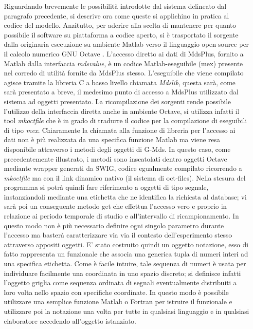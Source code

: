 Riguardando brevemente le possibilità introdotte dal sistema delineato
dal paragrafo precedente, si descrive ora come queste si applichino in
pratica al codice del modello. Anzitutto, per aderire alla scelta di
mantenere per quanto possibile il software su piattaforma a codice
aperto, si è trasportato il sorgente dalla originaria esecuzione su
ambiente Matlab verso il linguaggio open-source per il calcolo numerico
GNU Octave \cite{url_octave}. L'accesso diretto ai dati di MdsPlus,
fornito a Matlab dalla interfaccia \emph{mdsvalue}, è un codice
Matlab-eseguibile (mex) presente nel corredo di utilità fornite da
MdsPlus stesso. L'eseguibile che viene compilato agisce tramite la
libreria C a basso livello chiamata \emph{Mdslib}, questa sarà, come
sarà presentato a breve, il medesimo punto di accesso a MdsPlus
utilizzato dal sistema ad oggetti presentato. La ricompilazione dei
sorgenti rende possibile l'utilizzo della interfaccia diretta anche in
ambiente Octave, si utilizza infatti il tool \emph{mkoctfile} che è in
grado di tradurre il codice per la compilazione di eseguibili di tipo
\emph{mex}.  Chiaramente la chiamata alla funzione di libreria per
l'accesso ai dati non è più realizzata da una specifica funzione Matlab
ma viene resa disponibile attraverso i metodi degli oggetti di G-Mds. In
questo caso, come precedentemente illustrato, i metodi sono inscatolati
dentro oggetti Octave mediante wrapper generati da SWIG, codice
egualmente compilato ricorrendo a \emph{mkoctfile} ma con il link
dinamico nativo (il sistema di oct-files). Nella stesura del programma
si potrà quindi fare riferimento a oggetti di tipo segnale,
instanziandoli mediante una etichetta che ne identifica la richiesta al
database; vi sarà poi un conseguente metodo get che effettua l'accesso
vero e proprio in relazione ai periodo temporale di studio e
all'intervallo di ricampionamento. In questo modo non è più necessario
definire ogni singolo parametro durante l'accesso ma basterà
caratterizzare via via il contesto dell'esperimento stesso attraverso
appositi oggetti.  E' stato costruito quindi un oggetto notazione, esso
di fatto rappresenta un funzionale che associa una generica tupla di
numeri interi ad una specifica etichetta. Come è facile intuire, tale
sequenza di numeri è usata per individuare facilmente una coordinata in
uno spazio discreto; si definisce infatti l'oggetto griglia come
sequenza ordinata di segnali eventualmente distribuiti a loro volta
nello spazio con specifiche coordinate.  In questo modo è possibile
utilizzare una semplice funzione Matlab o Fortran per istruire il
funzionale e utilizzare poi la notazione una volta per tutte in qualsiasi
linguaggio e in qualsiasi elaboratore accedendo all'oggetto istanziato.

